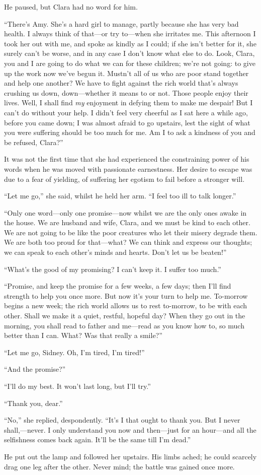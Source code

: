 He paused, but Clara had no word for him.

``There's Amy. She's a hard girl to manage, partly because she has very
bad health. I always think of that---or try to---when she irritates me.
This afternoon I took her out with me, and spoke as kindly as I could;
if she isn't better for it, she surely can't be worse, and in any case I
don't know what else to do. Look, Clara, you and I are going to do what
we can for these children; we're not going: to give up the work now
we've begun it. Mustn't all of us who are poor stand together and help
one another? We have to fight against the rich world that's always
crushing us down, down---whether it means to or not. Those people enjoy
their lives. Well, I shall find {}\emph{my} enjoyment in defying them to
make me despair! But I can't do without your help. I didn't feel very
cheerful as I sat here a while ago, before you came down; I was almost
afraid to go upstairs, lest the sight of what you were suffering should
be too much for me. Am I to ask a kindness of you and be refused,
Clara?''

It was not the first time that she had experienced the constraining
power of his words when he was moved with passionate earnestness. Her
desire to escape was due to a fear of yielding, of suffering her egotism
to fail before a stronger will.

``Let me go,'' she said, whilst he held her arm. ``I feel too ill to
talk longer.''

``Only one word---only one promise---now whilst we are the only ones
awake in the house. We are husband and wife, Clara, and we must be kind
to each other. We are not going to be like the poor creatures who let
their misery degrade them. We are both too proud for that---what? We can
think and express our thoughts; we can speak to each other's minds and
hearts. Don't let us be beaten!''

``What's the good of my promising? I can't keep it. I suffer too much.''

{}``Promise, and keep the promise for a few weeks, a few days; then I'll
find strength to help you once more. But now it's your turn to help me.
To-morrow begins a new week; the rich world allows us to rest to-morrow,
to be with each other. Shall we make it a quiet, restful, hopeful day?
When they go out in the morning, you shall read to father and me---read
as you know how to, so much better than I can. What? Was that really a
smile?''

``Let me go, Sidney. Oh, I'm tired, I'm tired!''

``And the promise?''

``I'll do my best. It won't last long, but I'll try.''

``Thank you, dear.''

``No,'' she replied, despondently. ``It's I that ought to thank you. But
I never shall,---never. I only understand you now and then---just for an
hour---and all the selfishness comes back again. It'll be the same till
I'm dead.''

He put out the lamp and followed her upstairs. His limbs ached; he could
scarcely drag one leg after the other. Never mind; the battle was gained
once more.
